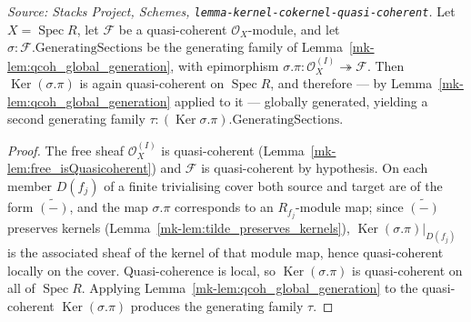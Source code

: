 \begin{lemma}
  \label{mk-lem:qcoh_kernel_qcoh}

  \textit{Source: Stacks Project, Schemes,
  \texttt{lemma-kernel-cokernel-quasi-coherent}.}
  Let \(X = \operatorname{Spec} R\), let \(\mathcal{F}\) be a quasi-coherent
  \(\mathcal{O}_X\)-module, and let \(\sigma : \mathcal{F}.\mathrm{GeneratingSections}\)
  be the generating family of Lemma~\ref{mk-lem:qcoh_global_generation}, with epimorphism
  \(\sigma.\pi : \mathcal{O}_X^{(I)} \twoheadrightarrow \mathcal{F}\). Then
  \(\operatorname{Ker}(\sigma.\pi)\) is again quasi-coherent on \(\operatorname{Spec} R\),
  and therefore — by Lemma~\ref{mk-lem:qcoh_global_generation} applied to it — globally
  generated, yielding a second generating family
  \(\tau : (\operatorname{Ker} \sigma.\pi).\mathrm{GeneratingSections}\).
\end{lemma}
\begin{proof}
  The free sheaf \(\mathcal{O}_X^{(I)}\) is quasi-coherent
  (Lemma~\ref{mk-lem:free_isQuasicoherent}) and \(\mathcal{F}\) is quasi-coherent by
  hypothesis. On each member \(D(f_j)\) of a finite trivialising cover both source and
  target are of the form \(\widetilde{(-)}\), and the map \(\sigma.\pi\) corresponds to an
  \(R_{f_j}\)-module map; since \(\widetilde{(-)}\) preserves kernels
  (Lemma~\ref{mk-lem:tilde_preserves_kernels}),
  \(\operatorname{Ker}(\sigma.\pi)|_{D(f_j)}\) is the associated sheaf of the kernel of
  that module map, hence quasi-coherent locally on the cover. Quasi-coherence is local,
  so \(\operatorname{Ker}(\sigma.\pi)\) is quasi-coherent on all of
  \(\operatorname{Spec} R\). Applying Lemma~\ref{mk-lem:qcoh_global_generation} to the
  quasi-coherent \(\operatorname{Ker}(\sigma.\pi)\) produces the generating family
  \(\tau\).
\end{proof}

